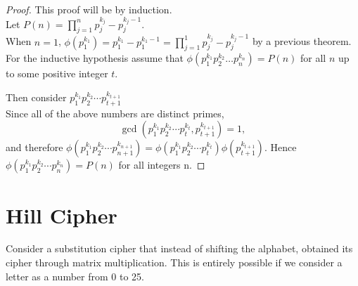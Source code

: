 \begin{proof}
This proof will be by induction.\\
Let $P(n) = \prod_{j=1}^n p_j^{k_j}-p_j^{k_j-1}$.\\
When $n = 1$,  $\phi(p_1^{k_1} )= p_1^{k_1}-p_1^{k_1-1} =\prod_{j=1}^1 p_j^{k_j}-p_j^{k_j-1}$
 by a previous theorem.
For the inductive hypothesis assume that $\phi(p_1^{k_1}p_2^{k_2}\dots p_n^{k_n}) = P(n)$ for all $n$ up to some positive integer $t$.

Then consider $p_1^{k_1}p_2^{k_2}\cdots p_{t+1}^{k_{t+1}}$\\
    Since all of the above numbers are distinct primes, 
\[\gcd\left(p_1^{k_1}p_2^{k_2}\cdots p_t^{k_t}, p_{t+1}^{k_{t+1}}\right) = 1,\]
and therefore $\phi (p_1^{k_1}p_2^{k_2}\cdots p_{n+1}^{k_{n+1}}) = \phi (p_1^{k_1}p_2^{k_2}\cdots p_{t}^{k_{t}}) \phi(p_{t+1}^{k_{t+1}})$.
Hence $\phi(p_1^{k_1}p_2^{k_2}\cdots p_n^{k_n}) = P(n)$ for all integers n.
\end{proof}

\section{Hill Cipher}
Consider a substitution cipher that instead of shifting the alphabet, obtained its cipher through matrix multiplication. This is entirely possible if we consider a letter as a number from 0 to 25.

